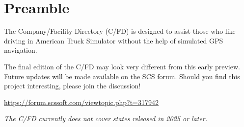 \maketitle

\vspace{5mm}
\section*{Preamble}

{
\justifying

The Company/Facility Directory (C/FD) is designed to assist those who like driving in American Truck Simulator without the help of simulated GPS navigation.

The final edition of the C/FD may look very different from this early preview.
Future updates will be made available on the SCS forum.
Should you find this project interesting, please join the discussion!

\centering \vspace{1ex}
\url{https://forum.scssoft.com/viewtopic.php?t=317942} \par
}

\copyrightblock
\thispagestyle{empty}

\tableofcontents
\thispagestyle{empty}

\vspace{1.5em} \noindent
\textsl{The C/FD currently does not cover states released in 2025 or later.}
